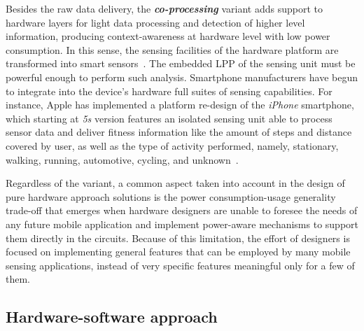 \documentclass[ENG,PhD]{cinvestav}
\begin{document}
Besides the raw data delivery, the \emph{\textbf{co-processing}} variant adds support to hardware layers for light data processing and detection of higher level information, producing context-awareness at hardware level with low power consumption.
In this sense, the sensing facilities of the hardware platform are transformed into smart sensors~\cite{Gervais-Ducouret2011}.
The embedded LPP of the sensing unit must be powerful enough to perform such analysis.
Smartphone manufacturers have begun to integrate into the device's hardware full suites of sensing capabilities.
For instance, Apple has implemented a platform re-design of the \emph{iPhone} smartphone, which starting at \emph{5s} version features an isolated sensing unit able to process sensor data and deliver fitness information like the amount of steps and distance covered by user, as well as the type of activity performed, namely, stationary, walking, running, automotive, cycling, and unknown~\cite{Apple2015}.

Regardless of the variant, a common aspect taken into account in the design of pure hardware approach solutions is the power consumption-usage generality trade-off that emerges when hardware designers are unable to foresee the needs of any future mobile application and implement power-aware mechanisms to support them directly in the circuits.
Because of this limitation, the effort of designers is focused on implementing general features that can be employed by many mobile sensing applications, instead of very specific features meaningful only for a few of them.

\subsection{Hardware-software approach}
\end{document}
